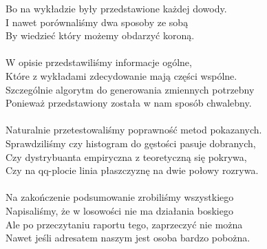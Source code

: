 \documentclass[12pt]{mwrep}
\begin{document}
	Bo na wykładzie były przedstawione każdej dowody.\\
	I nawet porównaliśmy dwa sposoby ze sobą\\
	By wiedzieć który możemy obdarzyć koroną.\\
	\\
	W opisie przedstawiliśmy informacje ogólne,\\
	Które z wykładami zdecydowanie mają części wspólne.\\
	Szczególnie algorytm do generowania zmiennych potrzebny\\
	Ponieważ przedstawiony została w nam sposób chwalebny.\\
	\\
	Naturalnie przetestowaliśmy poprawność metod pokazanych.\\
	Sprawdziliśmy czy histogram do gęstości pasuje dobranych,\\
	Czy dystrybuanta empiryczna z teoretyczną się pokrywa,\\
	Czy na qq-plocie linia płaszczyznę na dwie połowy rozrywa.\\
	\\
	Na zakończenie podsumowanie zrobiliśmy wszystkiego\\
	Napisaliśmy, że w losowości nie ma działania boskiego\\
	Ale po przeczytaniu raportu tego, zaprzeczyć nie można\\
	Nawet jeśli adresatem naszym jest osoba bardzo pobożna.\\
\end{document}
